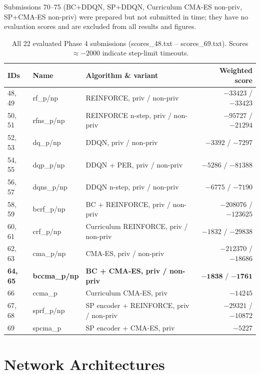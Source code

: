 \documentclass[11pt, oneside]{article}
\begin{document}
Submissions 70--75 (BC+DDQN, SP+DDQN, Curriculum CMA-ES non-priv, SP+CMA-ES non-priv) were prepared but not submitted in time; they have no evaluation scores and are excluded from all results and figures.

\begin{table}[H]\centering\small
\caption{All 22 evaluated Phase 4 submissions (scores\_48.txt -- scores\_69.txt). Scores $\approx -2000$ indicate step-limit timeouts.}
\setlength{\tabcolsep}{4pt}
\begin{tabular}{lllr}
\toprule
IDs & Name & Algorithm \& variant & Weighted score \\
\midrule
48, 49 & rf\_p/np & REINFORCE, priv / non-priv & $-33423$ / $-33423$ \\
50, 51 & rfns\_p/np & REINFORCE n-step, priv / non-priv & $-95727$ / $-21294$ \\
52, 53 & dq\_p/np & DDQN, priv / non-priv & $-3392$ / $-7297$ \\
54, 55 & dqp\_p/np & DDQN + PER, priv / non-priv & $-5286$ / $-81388$ \\
56, 57 & dqns\_p/np & DDQN n-step, priv / non-priv & $-6775$ / $-7190$ \\
58, 59 & bcrf\_p/np & BC + REINFORCE, priv / non-priv & $-208076$ / $-123625$ \\
60, 61 & crf\_p/np & Curriculum REINFORCE, priv / non-priv & $-1832$ / $-29838$ \\
62, 63 & cma\_p/np & CMA-ES, priv / non-priv & $-212370$ / $-18686$ \\
\textbf{64, 65} & \textbf{bccma\_p/np} & \textbf{BC + CMA-ES, priv / non-priv} & $\mathbf{-1838}$ / $\mathbf{-1761}$ \\
66 & ccma\_p & Curriculum CMA-ES, priv & $-14245$ \\
67, 68 & sprf\_p/np & SP encoder + REINFORCE, priv / non-priv & $-29321$ / $-10872$ \\
69 & spcma\_p & SP encoder + CMA-ES, priv & $-5227$ \\
\bottomrule
\end{tabular}
\end{table}

\section{Network Architectures}
\end{document}
